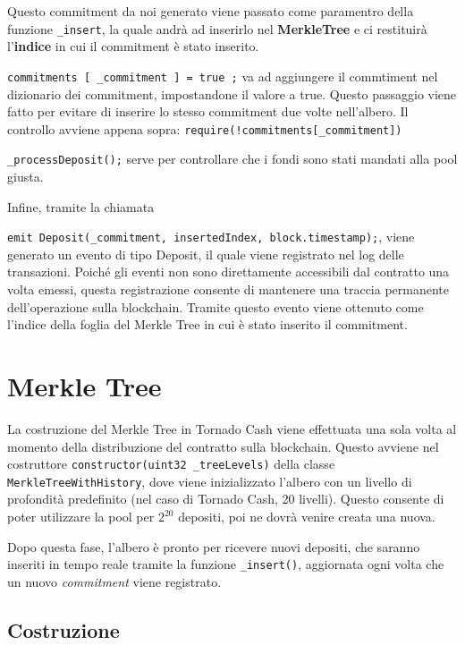 Questo commitment da noi generato viene passato come paramentro della funzione \verb|_insert|, la quale andrà ad inserirlo nel \textbf{MerkleTree} e ci restituirà l'\textbf{indice} in cui il commitment è stato inserito.

\verb|commitments [ _commitment ] = true ;| va ad aggiungere il commtiment nel dizionario dei commitment, impostandone il valore a true. Questo passaggio viene fatto per evitare di inserire lo stesso commitment due volte nell'albero. Il controllo avviene appena sopra: \verb|require(!commitments[_commitment])|

\verb|_processDeposit();| serve per controllare che i fondi sono stati mandati alla pool giusta.

Infine, tramite la chiamata 

\verb|emit Deposit(_commitment, insertedIndex, block.timestamp);|, viene generato un evento di tipo Deposit, il quale viene registrato nel log delle transazioni. Poiché gli eventi non sono direttamente accessibili dal contratto una volta emessi, questa registrazione consente di mantenere una traccia permanente dell'operazione sulla blockchain. Tramite questo evento viene ottenuto come l'indice della foglia del Merkle Tree in cui è stato inserito il commitment.

\section{Merkle Tree}

La costruzione del Merkle Tree in Tornado Cash viene effettuata una sola volta al momento della distribuzione del contratto sulla blockchain. Questo avviene nel costruttore \texttt{constructor(uint32 \_treeLevels)} della classe \texttt{MerkleTreeWithHistory}, dove viene inizializzato l'albero con un livello di profondità predefinito (nel caso di Tornado Cash, 20 livelli). Questo consente di poter utilizzare la pool per $2^{20}$ depositi, poi ne dovrà venire creata una nuova.

Dopo questa fase, l'albero è pronto per ricevere nuovi depositi, che saranno inseriti in tempo reale tramite la funzione \texttt{\_insert()}, aggiornata ogni volta che un nuovo \textit{commitment} viene registrato.

\subsection{Costruzione}

